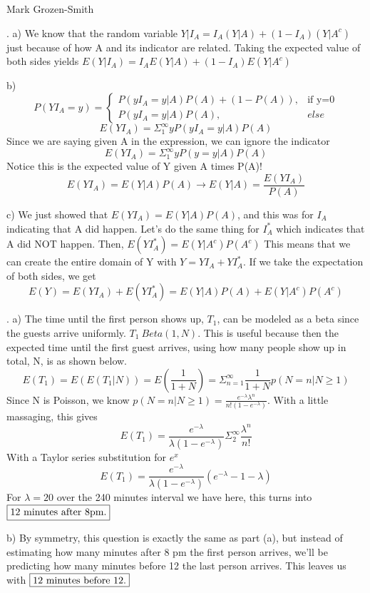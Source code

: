 \documentclass[11pt]{article}
\begin{document}
 \hfill Mark Grozen-Smith

\bigskip

. 
	a) We know that the random variable $Y|I_A = I_A(Y|A) + (1-I_A)(Y|A^c)$ just because of how A and its indicator are related.  Taking the expected value of both sides yields  $\boxed{E(Y|I_A) = I_AE(Y|A) + (1-I_A)E(Y|A^c)}$

\smallskip

	b) $$
		P(YI_A=y) =
		\begin{cases}
		P(yI_A=y|A)P(A)+(1-P(A)), & \text{if }\text{y=0} \\
		P(yI_A=y|A)P(A), & else
		\end{cases}
		$$
		$$E(YI_A) = \Sigma_1^\infty yP(yI_A=y|A)P(A)$$
		Since we are saying given A in the expression, we can ignore the indicator
		$$E(YI_A) = \Sigma_1^\infty yP(y=y|A)P(A)$$
		Notice this is the expected value of Y given A times P(A)!
		$$E(YI_A) = E(Y|A)P(A) \rightarrow E(Y|A)=\frac{E(YI_A)}{P(A)}$$
\smallskip

	c) We just showed that $E(YI_A) = E(Y|A)P(A)$, and this was for $I_A$ indicating that A did happen.  Let's do the same thing for $I_A^*$ which indicates that A did NOT happen. Then, $E(YI_A^*) = E(Y|A^c)P(A^c) $  This means that we can create the entire domain of Y with $Y=YI_A + YI_A^*$.  If we take the expectation of both sides, we get 
	$$\boxed{E(Y) = E(YI_A) + E(YI_A^*) = E(Y|A)P(A) + E(Y|A^c)P(A^c)}$$


\smallskip

\bigskip


. 
	a) The time until the first person shows up, $T_1$, can be modeled as a beta since the guests arrive uniformly.  $T_1~Beta(1, N)$.  This is useful because then the expected time until the first guest arrives, using how many people show up in total, N, is as shown below. 
	$$E(T_1) = E(E(T_1 | N)) = E(\frac{1}{1+N}) = \Sigma_{n=1}^\infty \frac{1}{1+N}p(N=n | N\ge1)$$
	Since N is Poisson, we know $p(N=n | N\ge1) = \frac{e^{-\lambda}\lambda^n}{n!(1-e^{-\lambda })}$.  With a little massaging, this gives
	$$E(T_1) = \frac{e^{-\lambda}}{\lambda(1-e^{-\lambda})}\Sigma^\infty_2 \frac{\lambda^{n}}{n!}$$
	With a Taylor series substitution for $e^x$
	$$\boxed{E(T_1) = \frac{e^{-\lambda}}{\lambda(1-e^{-\lambda})}(e^{-\lambda}-1-\lambda)} $$
	For $\lambda =20$ over the 240 minutes interval we have here, this turns into $\boxed{$12 minutes after 8pm.$} $  
\smallskip	
	
	b) By symmetry, this question is exactly the same as part (a), but instead of estimating how many minutes after 8 pm the first person arrives, we'll be predicting how many minutes before 12 the last person arrives.  This leaves us with $\boxed{$12 minutes before 12.$}$
\smallskip
	
\end{document}
